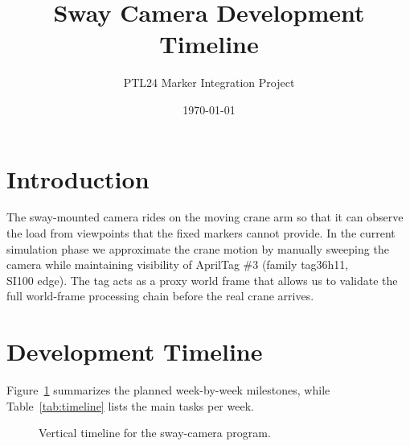 \documentclass[11pt]{article}
\title{Sway Camera Development Timeline}
\author{PTL24 Marker Integration Project}
\date{\today}
\begin{document}
\maketitle
\tableofcontents
\newpage

\section{Introduction}
The sway-mounted camera rides on the moving crane arm so that it can observe the load from viewpoints that the fixed markers cannot provide. In the current simulation phase we approximate the crane motion by manually sweeping the camera while maintaining visibility of AprilTag \#3 (family tag36h11, \\SI{100}{\milli\meter} edge). The tag acts as a proxy world frame that allows us to validate the full world-frame processing chain before the real crane arrives.

\section{Development Timeline}
Figure~\ref{fig:timeline} summarizes the planned week-by-week milestones, while Table~\ref{tab:timeline} lists the main tasks per week.

\begin{figure}[h]
    \centering
    \caption{Vertical timeline for the sway-camera program.}
    \label{fig:timeline}
\end{figure}
\end{document}
